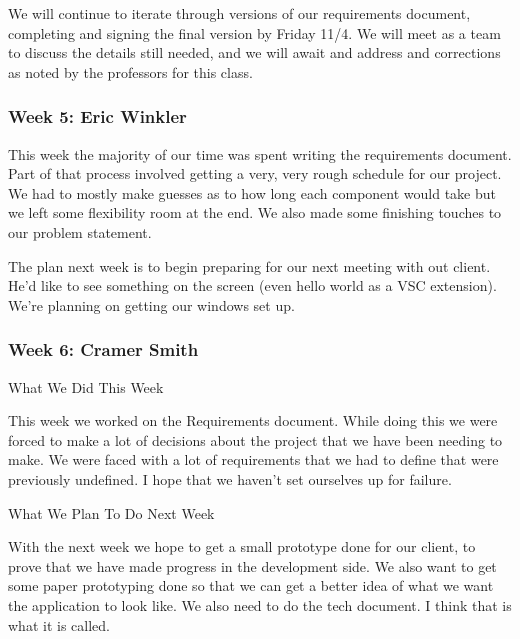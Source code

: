 We will continue to iterate through versions of our requirements document, completing and signing the final version by Friday 11/4. We will meet as a team to discuss the details still needed, and we will await and address and corrections as noted by the professors for this class. \\ 

 

 \subsubsection{Week 5: Eric Winkler}

This week the majority of our time was spent writing the requirements document. Part of that process involved getting a very, very rough schedule for our project. We had to mostly make guesses as to how long each component would take but we left some flexibility room at the end. We also made some finishing touches to our problem statement. 



The plan next week is to begin preparing for our next meeting with out client. He'd like to see something on the screen (even hello world as a VSC extension). We're planning on getting our windows set up. \\ 

 \subsubsection{Week 6: Cramer Smith}

What We Did This Week



This week we worked on the Requirements document. While doing this we were forced to make a lot of decisions about the project that we have been needing to make. We were faced with a lot of requirements that we had to define that were previously undefined. I hope that we haven't set ourselves up for failure. 



What We Plan To Do Next Week



With the next week we hope to get a small prototype done for our client, to prove that we have made progress in the development side. We also want to get some paper prototyping done so that we can get a better idea of what we want the application to look like. We also need to do the tech document. I think that is what it is called. \\ 


